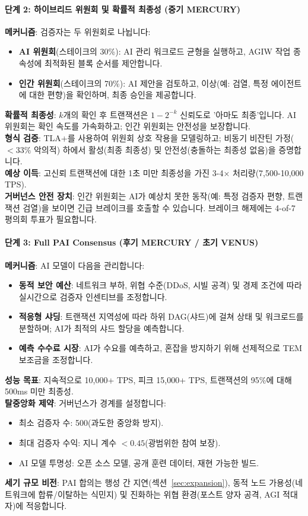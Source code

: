 \documentclass[11pt]{article}
\begin{document}
\paragraph{단계 2: 하이브리드 위원회 및 확률적 최종성 (중기 MERCURY)}
\textbf{메커니즘}: 검증자는 두 위원회로 나뉩니다:
\begin{itemize}[noitemsep]
  \item \textbf{AI 위원회}(스테이크의 30\%): AI 관리 워크로드 균형을 실행하고, AGIW 작업 종속성에 최적화된 블록 순서를 제안합니다.
  \item \textbf{인간 위원회}(스테이크의 70\%): AI 제안을 검토하고, 이상(예: 검열, 특정 에이전트에 대한 편향)을 확인하며, 최종 승인을 제공합니다.
\end{itemize}
\textbf{확률적 최종성}: $k$개의 확인 후 트랜잭션은 $1 - 2^{-k}$ 신뢰도로 '아마도 최종'입니다. AI 위원회는 확인 속도를 가속화하고; 인간 위원회는 안전성을 보장합니다.\\
\textbf{형식 검증}: TLA+를 사용하여 위원회 상호 작용을 모델링하고; 비동기 비잔틴 가정($<33\%$ 악의적) 하에서 활성(최종 최종성) 및 안전성(충돌하는 최종성 없음)을 증명합니다.\\
\textbf{예상 이득}: 고신뢰 트랜잭션에 대한 1초 미만 최종성을 가진 3-4$\times$ 처리량(7,500-10,000 TPS).\\
\textbf{거버넌스 안전 장치}: 인간 위원회는 AI가 예상치 못한 동작(예: 특정 검증자 편향, 트랜잭션 검열)을 보이면 긴급 브레이크를 호출할 수 있습니다. 브레이크 해제에는 4-of-7 평의회 투표가 필요합니다.

\paragraph{단계 3: Full PAI Consensus (후기 MERCURY / 초기 VENUS)}
\textbf{메커니즘}: AI 모델이 다음을 관리합니다:
\begin{itemize}[noitemsep]
  \item \textbf{동적 보안 예산}: 네트워크 부하, 위협 수준(DDoS, 시빌 공격) 및 경제 조건에 따라 실시간으로 검증자 인센티브를 조정합니다.
  \item \textbf{적응형 샤딩}: 트랜잭션 지역성에 따라 하위 DAG(샤드)에 걸쳐 상태 및 워크로드를 분할하며; AI가 최적의 샤드 할당을 예측합니다.
  \item \textbf{예측 수수료 시장}: AI가 수요를 예측하고, 혼잡을 방지하기 위해 선제적으로 TEM 보조금을 조정합니다.
\end{itemize}
\textbf{성능 목표}: 지속적으로 10,000+ TPS, 피크 15,000+ TPS, 트랜잭션의 95\%에 대해 500ms 미만 최종성.\\
\textbf{탈중앙화 제약}: 거버넌스가 경계를 설정합니다:
\begin{itemize}[noitemsep]
  \item 최소 검증자 수: 500(과도한 중앙화 방지).
  \item 최대 검증자 수익: 지니 계수 $<0.45$(광범위한 참여 보장).
  \item AI 모델 투명성: 오픈 소스 모델, 공개 훈련 데이터, 재현 가능한 빌드.
\end{itemize}
\textbf{세기 규모 비전}: PAI 합의는 행성 간 지연(섹션~\ref{sec:expansion}), 동적 노드 가용성(네트워크에 합류/이탈하는 식민지) 및 진화하는 위협 환경(포스트 양자 공격, AGI 적대자)에 적응합니다.
\end{document}
